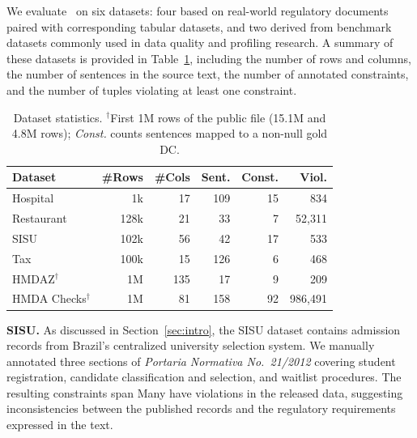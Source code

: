 We evaluate \system\ on six datasets: four based on real-world regulatory documents paired with corresponding tabular datasets, and two derived from benchmark datasets commonly used in data quality and profiling research. A summary of these datasets is provided in Table~\ref{tab:datasets}, including the number of rows and columns, the number of sentences in the source text, the number of annotated constraints, and the number of tuples violating at least one constraint. 



\begin{table}[ht]
  \centering
\small
  \begin{tabular}{lrrrrr}
    \toprule
    \textbf{Dataset} & \textbf{\#Rows} & \textbf{\#Cols} & \textbf{Sent.} & \textbf{Const.} & \textbf{Viol.} \\
    \midrule
    Hospital & 1k & 17 & 109 & 15 & 834 \\
    Restaurant & 128k & 21 & 33 & 7 & 52,311 \\
    SISU & 102k & 56 & 42 & 17 & 533 \\
    Tax & 100k & 15 & 126 & 6 & 468 \\
    HMDAZ$^{\dagger}$ & 1M & 135 & 17 & 9 & 209 \\
    HMDA Checks$^{\dagger}$ & 1M & 81 & 158 & 92 & 986,491 \\
    \bottomrule
  \end{tabular}%
    \caption{Dataset statistics. $^{\dagger}$First 1M rows of the public file (15.1M and 4.8M rows); \emph{Const.} counts sentences mapped to a non-null gold DC.}
  \label{tab:datasets}
\end{table}

\smallskip\noindent\textbf{SISU.}
As discussed in Section~\ref{sec:intro}, the SISU dataset contains admission
records from Brazil's centralized university selection system. We manually
annotated three sections of \textit{Portaria Normativa No.~21/2012} covering student
registration, candidate classification and selection, and waitlist procedures.
The resulting constraints span  Many have violations in
the released data, suggesting inconsistencies between the published records and
the regulatory requirements expressed in the text.



